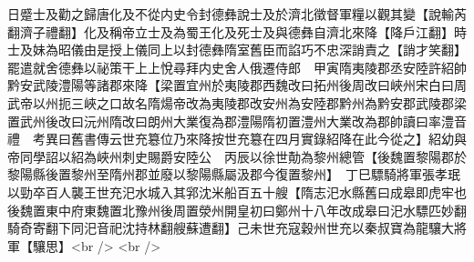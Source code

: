日蹙士及勸之歸唐化及不從内史令封德彝說士及於濟北徵督軍糧以觀其變【說輸芮翻濟子禮翻】化及稱帝立士及為蜀王化及死士及與德彝自濟北來降【降戶江翻】時士及妹為昭儀由是授上儀同上以封德彝隋室舊臣而諂巧不忠深誚責之【誚才笑翻】罷遣就舍德彝以祕策干上上悅尋拜内史舍人俄遷侍郎　甲寅隋夷陵郡丞安陸許紹帥黔安武陵澧陽等諸郡來降【梁置宜州於夷陵郡西魏改曰拓州後周改曰峽州宋白曰周武帝以州扼三峽之口故名隋煬帝改為夷陵郡改安州為安陸郡黔州為黔安郡武陵郡梁置武州後改曰沅州隋改曰朗州大業復為郡澧陽隋初置澧州大業改為郡帥讀曰率澧音禮　考異曰舊書傳云世充簒位乃來降按世充簒在四月實錄紹降在此今從之】紹幼與帝同學詔以紹為峽州刺史賜爵安陸公　丙辰以徐世勣為黎州總管【後魏置黎陽郡於黎陽縣後置黎州至隋州郡並廢以黎陽縣屬汲郡今復置黎州】　丁巳驃騎將軍張孝珉以勁卒百人襲王世充汜水城入其郛沈米船百五十艘【隋志汜水縣舊曰成皋即虎牢也後魏置東中府東魏置北豫州後周置滎州開皇初曰鄭州十八年改成皋曰汜水驃匹妙翻騎奇寄翻下同汜音祀沈持林翻艘蘇遭翻】己未世充寇穀州世充以秦叔寶為龍驤大將軍【驤思】<br />
<br />
